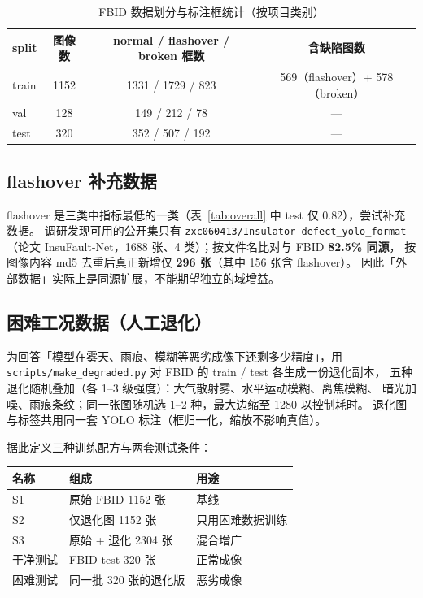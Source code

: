 \documentclass[UTF8,a4paper,11pt]{ctexart}
\begin{document}
\begin{table}[htbp]
\centering
\caption{FBID 数据划分与标注框统计（按项目类别）}
\label{tab:data}
\begin{tabular}{lccc}
\toprule
split & 图像数 & normal / flashover / broken 框数 & 含缺陷图数 \\
\midrule
train & 1152 & 1331 / 1729 / 823 & 569（flashover）+ 578（broken） \\
val   & 128  & 149 / 212 / 78   & --- \\
test  & 320  & 352 / 507 / 192  & --- \\
\bottomrule
\end{tabular}
\end{table}

\subsection{flashover 补充数据}

flashover 是三类中指标最低的一类（表~\ref{tab:overall} 中 test 仅 0.82），尝试补充数据。
调研发现可用的公开集只有 \texttt{zxc060413/Insulator-defect\_yolo\_format}
（论文 InsuFault-Net，1688 张、4 类）；按文件名比对与 FBID \textbf{82.5\% 同源}，
按图像内容 md5 去重后真正新增仅 \textbf{296 张}（其中 156 张含 flashover）。
因此「外部数据」实际上是同源扩展，不能期望独立的域增益。

\subsection{困难工况数据（人工退化）}

为回答「模型在雾天、雨痕、模糊等恶劣成像下还剩多少精度」，用
\texttt{scripts/make\_degraded.py} 对 FBID 的 train / test 各生成一份退化副本，
五种退化随机叠加（各 1--3 级强度）：大气散射雾、水平运动模糊、离焦模糊、
暗光加噪、雨痕条纹；同一张图随机选 1--2 种，最大边缩至 1280 以控制耗时。
退化图与标签共用同一套 YOLO 标注（框归一化，缩放不影响真值）。

据此定义三种训练配方与两套测试条件：

\begin{center}
\begin{tabular}{lll}
\toprule
名称 & 组成 & 用途 \\
\midrule
S1 & 原始 FBID 1152 张 & 基线 \\
S2 & 仅退化图 1152 张 & 只用困难数据训练 \\
S3 & 原始 + 退化 2304 张 & 混合增广 \\
\midrule
干净测试 & FBID test 320 张 & 正常成像 \\
困难测试 & 同一批 320 张的退化版 & 恶劣成像 \\
\bottomrule
\end{tabular}
\end{center}
\end{document}
